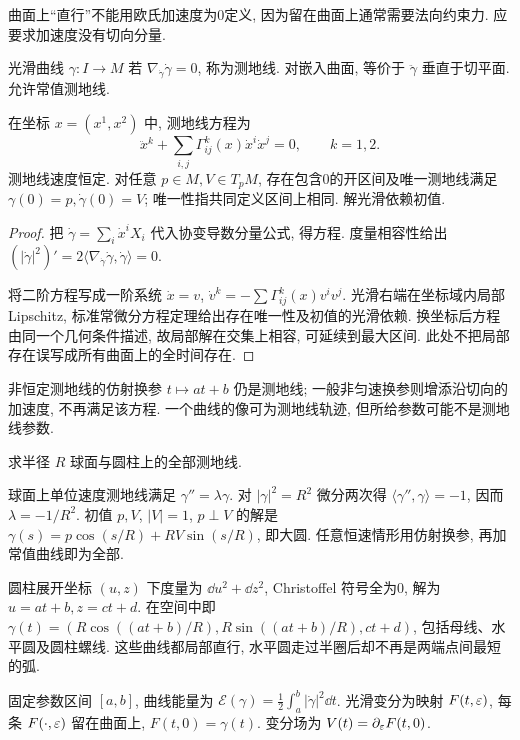 曲面上“直行”不能用欧氏加速度为0定义, 因为留在曲面上通常需要法向约束力. 应要求加速度没有切向分量.
\begin{definition}
光滑曲线 $\gamma:I\to M$ 若 $\nabla_{\dot\gamma}\dot\gamma=0$, 称为测地线. 对嵌入曲面, 等价于 $\ddot\gamma$ 垂直于切平面. 允许常值测地线.
\end{definition}
\begin{proposition}\label{prop:geodesic-eq}
在坐标 $x=(x^1,x^2)$ 中, 测地线方程为
\begin{equation}\label{eq:geodesic}
 \ddot x^k+\sum_{i,j}\Gamma^k_{ij}(x)\dot x^i\dot x^j=0,\qquad k=1,2.
\end{equation}
测地线速度恒定. 对任意 $p\in M,V\in T_pM$, 存在包含0的开区间及唯一测地线满足 $\gamma(0)=p,\dot\gamma(0)=V$; 唯一性指共同定义区间上相同. 解光滑依赖初值.
\end{proposition}
\begin{proof}
把 $\dot\gamma=\sum_i\dot x^iX_i$ 代入协变导数分量公式, 得方程. 度量相容性给出 $(|\dot\gamma|^2)'=2\langle\nabla_{\dot\gamma}\dot\gamma,\dot\gamma\rangle=0$.

将二阶方程写成一阶系统 $\dot x=v$, $\dot v^k=-\sum\Gamma^k_{ij}(x)v^iv^j$. 光滑右端在坐标域内局部 Lipschitz, 标准常微分方程定理给出存在唯一性及初值的光滑依赖. 换坐标后方程由同一个几何条件描述, 故局部解在交集上相容, 可延续到最大区间. 此处不把局部存在误写成所有曲面上的全时间存在.
\end{proof}
非恒定测地线的仿射换参 $t\mapsto at+b$ 仍是测地线; 一般非匀速换参则增添沿切向的加速度, 不再满足该方程. 一个曲线的像可为测地线轨迹, 但所给参数可能不是测地线参数.
\begin{example}
求半径 $R$ 球面与圆柱上的全部测地线.
\end{example}
\begin{solution}
球面上单位速度测地线满足 $\gamma''=\lambda\gamma$. 对 $|\gamma|^2=R^2$ 微分两次得 $\langle\gamma'',\gamma\rangle=-1$, 因而 $\lambda=-1/R^2$. 初值 $p,V$, $|V|=1$, $p\perp V$ 的解是 $\gamma(s)=p\cos(s/R)+RV\sin(s/R)$, 即大圆. 任意恒速情形用仿射换参, 再加常值曲线即为全部.

圆柱展开坐标 $(u,z)$ 下度量为 $\dd u^2+\dd z^2$, Christoffel 符号全为0, 解为 $u=at+b,z=ct+d$. 在空间中即 $\gamma(t)=(R\cos((at+b)/R),R\sin((at+b)/R),ct+d)$, 包括母线、水平圆及圆柱螺线. 这些曲线都局部直行, 水平圆走过半圈后却不再是两端点间最短的弧.
\end{solution}
\begin{definition}
固定参数区间 $[a,b]$, 曲线能量为 $\mathcal E(\gamma)=\frac12\int_a^b|\dot\gamma|^2\dd t$. 光滑变分为映射 $F(t,\varepsilon)$, 每条 $F(\cdot,\varepsilon)$ 留在曲面上, $F(t,0)=\gamma(t)$. 变分场为 $V(t)=\partial_\varepsilon F(t,0)$.
\end{definition}
